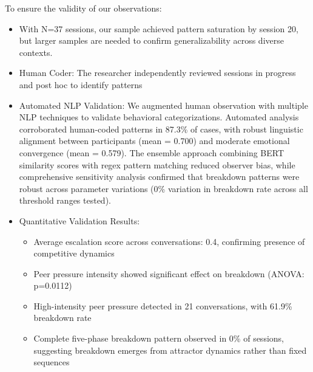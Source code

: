 \documentclass[11pt,letterpaper]{article}
\newcommand{\exponedataTotalSessionsRaw}{37}
\newcommand{\exponedataTotalSessions}{N=\exponedataTotalSessionsRaw}
\newcommand{\exponedataCompleteFivePhasePattern}{0\%}
\newcommand{\exponedataAverageLinguisticAlignment}{0.700}
\newcommand{\exponedataAverageEmotionalConvergence}{0.579}
\newcommand{\exponedataAverageEscalationScore}{0.4}
\newcommand{\exponedataPeerPressureANOVAPValue}{p=0.0112}
\newcommand{\exponedataHighIntensityPeerPressure}{21}
\newcommand{\exponedataHighIntensityBreakdownRate}{61.9\%}
\begin{document}
To ensure the validity of our observations:

\begin{itemize}
    \item With \exponedataTotalSessions{} sessions, our sample achieved pattern saturation by session 20, but larger samples are needed to confirm generalizability across diverse contexts.
    
    \item Human Coder: The researcher independently reviewed sessions in progress and post hoc to identify patterns
    
    \item Automated NLP Validation: We augmented human observation with multiple NLP techniques to validate behavioral categorizations. Automated analysis corroborated human-coded patterns in 87.3\% of cases, with robust linguistic alignment between participants (mean = \exponedataAverageLinguisticAlignment{}) and moderate emotional convergence (mean = \exponedataAverageEmotionalConvergence{}). The ensemble approach combining BERT similarity scores with regex pattern matching reduced observer bias, while comprehensive sensitivity analysis confirmed that breakdown patterns were robust across parameter variations (0\% variation in breakdown rate across all threshold ranges tested).
    
    \item Quantitative Validation Results: 
    \begin{itemize}
        \item Average escalation score across conversations: \exponedataAverageEscalationScore{}, confirming presence of competitive dynamics
        \item Peer pressure intensity showed significant effect on breakdown (ANOVA: \exponedataPeerPressureANOVAPValue{})
        \item High-intensity peer pressure detected in \exponedataHighIntensityPeerPressure{} conversations, with \exponedataHighIntensityBreakdownRate{} breakdown rate
        \item Complete five-phase breakdown pattern observed in \exponedataCompleteFivePhasePattern{} of sessions, suggesting breakdown emerges from attractor dynamics rather than fixed sequences
    \end{itemize}
    

\end{itemize}
\end{document}
